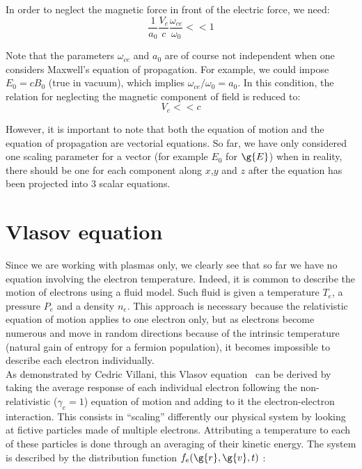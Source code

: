 \noindent In order to neglect the magnetic force in front of the electric force, we need:
$$
\frac{1}{a_0}\frac{V_e}{c}\frac{\omega_{ce}}{ \omega_0} << 1
$$

\noindent Note that the parameters $\omega_{ce}$ and $a_0$ are of course not independent when one considers Maxwell's equation of propagation. For example, we could impose $E_0 = c B_0$ (true in vacuum), which implies $\omega_{ce}/\omega_0 = a_0$. In this condition, the relation for neglecting the magnetic component of field is reduced to:
$$
V_e << c
$$

\noindent However, it is important to note that both the equation of motion and the equation of propagation are vectorial equations. So far, we have only considered one scaling parameter for a vector (for example $E_0$ for $\g{E}$) when in reality, there should be one for each component along $x$,$y$ and $z$ after the equation has been projected into 3 scalar equations.


\section{Vlasov equation}

\noindent Since we are working with plasmas only, we clearly see that so far we have no equation involving the electron temperature. Indeed, it is common to describe the motion of
electrons using a fluid model. Such fluid is given a temperature $T_e$, a pressure $P_e$ and a density $n_e$. This approach is necessary because the relativistic equation of motion applies to one electron only, but as electrons become numerous and move in random directions because of the intrinsic temperature (natural gain of entropy for a fermion population), it becomes impossible to describe each electron individually. \\

\noindent As demonstrated by Cedric Villani\cite{villani2001limite}, this Vlasov equation~\cite{vlasov1968vibrational,landau1946vibrations} can be derived by taking the average response of each individual electron following the non-relativistic ($\gamma_e = 1$) equation of motion and adding to it the electron-electron interaction. This consists in ``scaling'' differently our physical system by looking at fictive particles made of multiple electrons. Attributing a temperature to each of these particles is done through an averaging of their kinetic energy. 
The system is described by the distribution function $f_e(\g{r},\g{v},t)$ :




